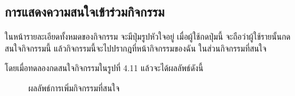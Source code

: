 \subsection{การแสดงความสนใจเข้าร่วมกิจกรรม}
ในหน้ารายละเอียดทั้งหมดของกิจกรรม จะมีปุ่มรูปหัวใจอยู่ เมื่อผู้ใช้กดปุ่มนี้ จะถือว่าผู้ใช้รายนั้นกดสนใจกิจกรรมนี้ แล้วกิจกรรมนี้จะไปปรากฎที่หน้ากิจกรรมของฉัน ในส่วนกิจกรรมที่สนใจ

โดยเมื่อทดลองกดสนใจกิจกรรมในรูปที่ 4.11 แล้วจะได้ผลลัพธ์ดังนี้
\begin{figure}[H]
    \begin{center}
    \end{center}
    \caption[ผลทดลองผลลัพธ์การเพิ่มกิจกรรมที่สนใจ]{ผลลัพธ์การเพิ่มกิจกรรมที่สนใจ}
    \label{fig:test-interest}
\end{figure}
